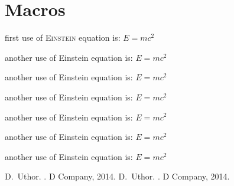 \documentclass[12pt]{article}
\def\eq1{E=mc^2} \label{p1}
\begin{document}
\section{Macros}
first use of \textsc{Einstein} equation \cite{p1} is: $\eq1$

another use of Einstein equation \cite{ref1} is: $\eq1$

\begin{large} another use of Einstein equation is: $\eq1$ \end{large}

\begin{Large} another use of Einstein equation is: $\eq1$ \end{Large}

\begin{Huge} another use of Einstein equation is: $\eq1$ \end{Huge}

\begin{small} another use of Einstein equation is: $\eq1$ \end{small}

\begin{tiny} another use of Einstein equation is: $\eq1$ \end{tiny}



\begin{thebibliography}{}
	D.~Uthor.
	.
	\newblock D Company, 2014.	
	D.~Uthor.
	.
	\newblock D Company, 2014.
\end{thebibliography}
\end{document}
